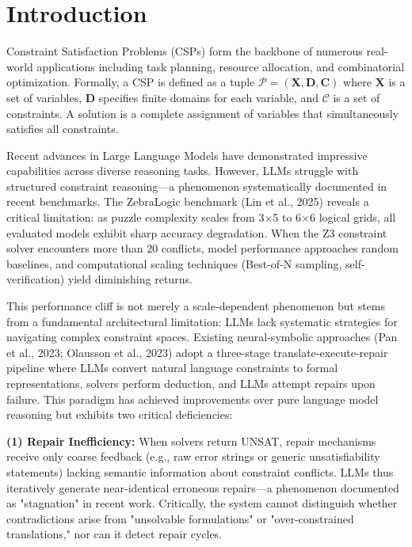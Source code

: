
\section{Introduction}

Constraint Satisfaction Problems (CSPs) form the backbone of numerous real-world applications including task planning, resource allocation, and combinatorial optimization. Formally, a CSP is defined as a tuple $\mathcal{P} = (\mathbf{X}, \mathbf{D}, \mathbf{C})$ where $\mathbf{X}$ is a set of variables, $\mathbf{D}$ specifies finite domains for each variable, and $\mathcal{C}$ is a set of constraints. A solution is a complete assignment of variables that simultaneously satisfies all constraints.

Recent advances in Large Language Models have demonstrated impressive capabilities across diverse reasoning tasks. However, LLMs struggle with structured constraint reasoning—a phenomenon systematically documented in recent benchmarks. The ZebraLogic benchmark (Lin et al., 2025) reveals a critical limitation: as puzzle complexity scales from 3$\times$5 to 6$\times$6 logical grids, all evaluated models exhibit sharp accuracy degradation. When the Z3 constraint solver encounters more than 20 conflicts, model performance approaches random baselines, and computational scaling techniques (Best-of-N sampling, self-verification) yield diminishing returns.

This performance cliff is not merely a scale-dependent phenomenon but stems from a fundamental architectural limitation: LLMs lack systematic strategies for navigating complex constraint spaces. Existing neural-symbolic approaches (Pan et al., 2023; Olausson et al., 2023) adopt a three-stage translate-execute-repair pipeline where LLMs convert natural language constraints to formal representations, solvers perform deduction, and LLMs attempt repairs upon failure. This paradigm has achieved improvements over pure language model reasoning but exhibits two critical deficiencies:

\textbf{(1) Repair Inefficiency:} When solvers return UNSAT, repair mechanisms receive only coarse feedback (e.g., raw error strings or generic unsatisfiability statements) lacking semantic information about constraint conflicts. LLMs thus iteratively generate near-identical erroneous repairs—a phenomenon documented as "stagnation" in recent work. Critically, the system cannot distinguish whether contradictions arise from "unsolvable formulations" or "over-constrained translations," nor can it detect repair cycles.

